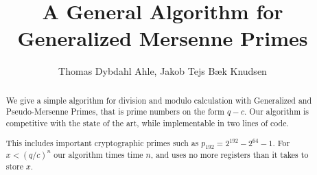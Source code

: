 
\title{
   A General Algorithm for Generalized Mersenne Primes
}
\author{Thomas Dybdahl Ahle, Jakob Tejs Bæk Knudsen}
\maketitle

\begin{abstract}
   We give a simple algorithm for division and modulo calculation with
   Generalized and Pseudo-Mersenne Primes, that is prime numbers on the form $q-c$.
   Our algorithm is competitive with the state of the art, while implementable in two lines of code.

   This includes important cryptographic primes such as $p_{192}=2^{192} - 2^{64} - 1$.
   For $x < (q/c)^n$ our algorithm times time $n$, and uses no more registers than it takes to store $x$.
\end{abstract}
